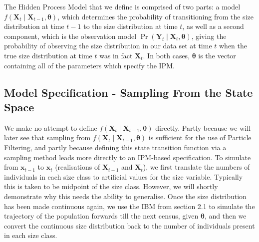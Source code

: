 \documentclass[a4paper,12pt]{article}
\begin{document}
The Hidden Process Model that we define is comprised of two parts: a model $f(\boldsymbol{X}_t \mid \boldsymbol{X}_{t-1}, \boldsymbol{\theta})$, which determines the probability of transitioning from the size distribution at time $t-1$ to the size distribution at time $t$, as well as a second component, which is the observation model $\Pr(\boldsymbol{Y}_t \mid \boldsymbol{X}_t, \boldsymbol{\theta})$, giving the probability of observing the size distribution in our data set at time $t$ when the true size distribution at time $t$ was in fact $\boldsymbol{X}_t$. In both cases, $\boldsymbol{\theta}$ is the vector containing all of the parameters which specify the IPM.\\


\subsection{Model Specification - Sampling From the State Space}

We make no attempt to define $f(\boldsymbol{X}_t \mid \boldsymbol{X}_{t-1}, \boldsymbol{\theta})$ directly. Partly because we will later see that sampling from $f(\boldsymbol{X}_t \mid \boldsymbol{X}_{t-1}, \boldsymbol{\theta})$ is sufficient for the use of Particle Filtering, and partly because defining this state transition function via a sampling method leads more directly to an IPM-based specification. To simulate from $\boldsymbol{x}_{t-1}$ to $\boldsymbol{x}_{t}$ (realisations of $\boldsymbol{X}_{t-1}$ and $\boldsymbol{X}_{t}$), we first translate the numbers of individuals in each size class to artificial values for the size variable. Typically this is taken to be midpoint of the size class. However, we will shortly demonstrate why this needs the ability to generalise. Once the size distribution has been made continuous again, we use the IBM from section 2.1 to simulate the trajectory of the population forwards till the next census, given $\boldsymbol{\theta}$, and then we convert the continuous size distribution back to the number of individuals present in each size class.\\
\end{document}
